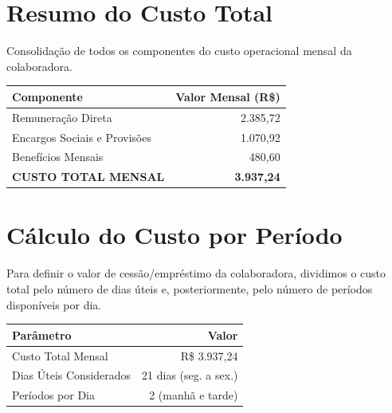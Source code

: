 \documentclass[12pt, a4paper]{article}
\newcommand{\reais}[1]{R\$ #1}
\begin{document}
\section{Resumo do Custo Total}

Consolidação de todos os componentes do custo operacional mensal da colaboradora.

\begin{table}[H]
    \centering
    \renewcommand{\arraystretch}{1.6}
    \begin{tabularx}{\textwidth}{X r}
        \toprule
        \rowcolor{tableHeader} \textbf{Componente} & \textbf{Valor Mensal (R\$)} \\
        \midrule
        Remuneração Direta & 2.385,72 \\
        \rowcolor{lightGray}
        Encargos Sociais e Provisões & 1.070,92 \\
        Benefícios Mensais & 480,60 \\
        \midrule
        \rowcolor{primaryColor!15} \textbf{CUSTO TOTAL MENSAL} & \textbf{3.937,24} \\
        \bottomrule
    \end{tabularx}
\end{table}

\section{Cálculo do Custo por Período}

Para definir o valor de cessão/empréstimo da colaboradora, dividimos o custo total pelo número de dias úteis e, posteriormente, pelo número de períodos disponíveis por dia.

\begin{table}[H]
    \centering
    \renewcommand{\arraystretch}{1.5}
    \begin{tabularx}{\textwidth}{X r}
        \toprule
        \rowcolor{tableHeader} \textbf{Parâmetro} & \textbf{Valor} \\
        \midrule
        Custo Total Mensal & \reais{3.937,24} \\
        \rowcolor{lightGray}
        Dias Úteis Considerados & 21 dias (seg. a sex.) \\
        Períodos por Dia & 2 (manhã e tarde) \\
        \bottomrule
    \end{tabularx}
\end{table}

\vspace{0.5cm}
\end{document}
